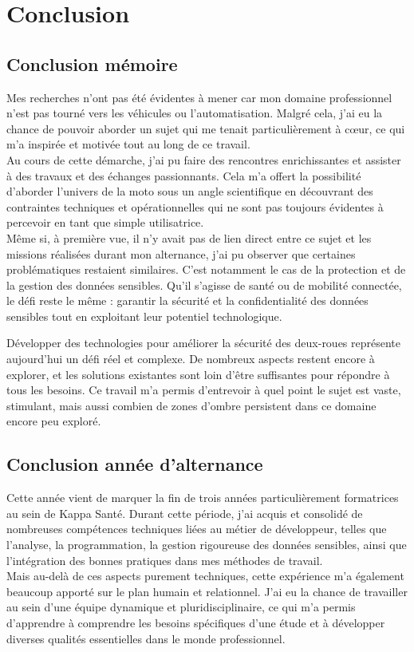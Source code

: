 \section{Conclusion}


\subsection{Conclusion mémoire}
Mes recherches n’ont pas été évidentes à mener car mon domaine professionnel  n’est pas tourné vers les véhicules ou l’automatisation. Malgré cela, j’ai eu la chance de pouvoir aborder un sujet qui me tenait particulièrement à cœur, ce qui m'a inspirée et motivée tout au long de ce travail.\\
Au cours de cette démarche, j’ai pu faire des rencontres enrichissantes et assister à des travaux et des échanges passionnants. Cela m’a offert la possibilité d’aborder l’univers de la moto sous un angle scientifique en découvrant des contraintes techniques et opérationnelles qui ne sont pas toujours évidentes à percevoir en tant que simple utilisatrice.\\
Même si, à première vue, il n’y avait pas de lien direct entre ce sujet et les missions réalisées durant mon alternance, j’ai pu observer que certaines problématiques restaient similaires. C’est notamment le cas de la protection et de la gestion des données sensibles. Qu’il s’agisse de santé ou de mobilité connectée, le défi reste le même : garantir la sécurité et la confidentialité des données sensibles tout en exploitant leur potentiel technologique.
\vspace{0.5cm}

Développer des technologies pour améliorer la sécurité des deux-roues représente aujourd’hui un défi réel et complexe. De nombreux aspects restent encore à explorer, et les solutions existantes sont loin d’être suffisantes pour répondre à tous les besoins. Ce travail m’a permis d'entrevoir à quel point le sujet est vaste, stimulant, mais aussi combien de zones d’ombre persistent dans ce domaine encore peu exploré.


\subsection{Conclusion année d'alternance}
Cette année vient de marquer la fin de trois années particulièrement formatrices au sein de Kappa Santé. Durant cette période, j’ai acquis et consolidé de nombreuses compétences techniques liées au métier de développeur, telles que l’analyse, la programmation, la gestion rigoureuse des données sensibles, ainsi que l’intégration des bonnes pratiques dans mes méthodes de travail.\\
Mais au-delà de ces aspects purement techniques, cette expérience m'a également beaucoup apporté sur le plan humain et relationnel. J'ai eu la chance de travailler au sein d'une équipe dynamique et pluridisciplinaire, ce qui m’a permis d’apprendre à comprendre les besoins spécifiques d'une étude et à développer diverses qualités essentielles dans le monde professionnel.
\vspace{0.5cm}

